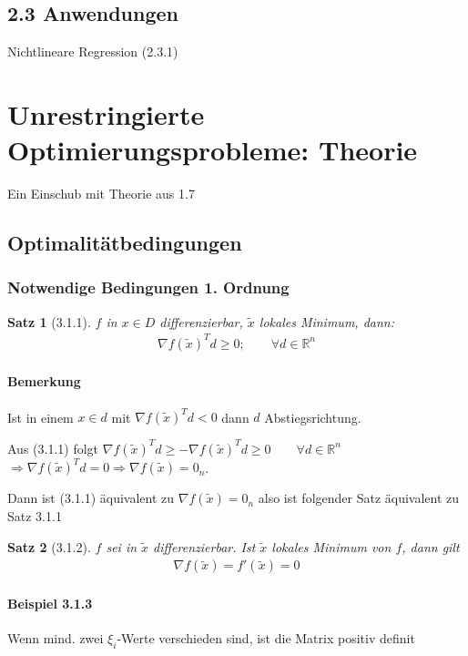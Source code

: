\documentclass[ngerman,halfparskip]{scrartcl}
\newtheorem*{satz}{Satz}
\theoremstyle{definition}
\def\R{\mathbb R}
\begin{document}
\subsection*{2.3 Anwendungen}
Nichtlineare Regression (2.3.1)

\section{Unrestringierte Optimierungsprobleme: Theorie}
Ein Einschub mit Theorie aus 1.7
\subsection{Optimalitätbedingungen}
\subsubsection{Notwendige Bedingungen 1. Ordnung}
\begin{satz}[3.1.1] $f$ in $x\in D$ differenzierbar, $\tilde x$ lokales Minimum, dann:\\
\begin{gather}\tag{3.1.1} \nabla f(\tilde x)^T d \geq 0; \qquad \forall d\in \R^n \end{gather}
\end{satz}
\paragraph{Bemerkung} Ist in einem $x\in d$ mit $\nabla f(\tilde x)^T d < 0$ dann $d$ Abstiegsrichtung. 

Aus (3.1.1) folgt $\nabla f(\tilde x)^T d \geq -\nabla f(\tilde x)^T d \geq 0\qquad \forall d \in \R^n$\\
$\Rightarrow \nabla f(\tilde x)^T d =0 \Rightarrow \nabla f(\tilde x)=0_n$.

Dann ist (3.1.1) äquivalent zu $\nabla f(\tilde x)=0_n$ also ist folgender Satz äquivalent zu Satz 3.1.1
\begin{satz}[3.1.2] $f$ sei in $\tilde x$ differenzierbar. Ist $\tilde x$ lokales Minimum von $f$,  dann gilt
\begin{gather}\tag{3.1.2}\nabla f(\tilde x)=f'(\tilde x)=0\end{gather}
\end{satz}

\paragraph{Beispiel 3.1.3} Wenn mind. zwei $\xi_i$-Werte verschieden sind, ist die Matrix positiv definit
\end{document}
